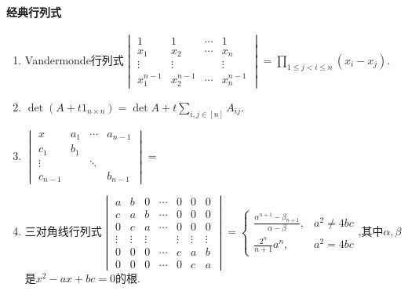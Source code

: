 \documentclass[openany]{book}
\begin{document}
\paragraph{经典行列式}
\begin{enumerate}
    \item Vandermonde行列式$\begin{vmatrix}
        1&1&\cdots&1\\ x_1&x_2&\cdots&x_n\\\vdots&\vdots&&\vdots\\x_1^{n-1}&x_2^{n-1}&\cdots&x_n^{n-1}
    \end{vmatrix}=\prod_{1\leq j<i\leq n}(x_i-x_j)$.
    \item $\det(A+t1_{n\times n})=\det A+t\sum_{i,j\in [n]}A_{ij}$.
    \item $\begin{vmatrix}
        x&a_1&\cdots&a_{n-1}\\c_1&b_1&&\\\vdots&&\ddots&\\c_{n-1}&&&b_{n-1}
    \end{vmatrix}=$
    \item 三对角线行列式$\begin{vmatrix}
    a&b&0&\cdots&0&0&0\\c&a&b&\cdots&0&0&0\\0&c&a&\cdots&0&0&0\\\vdots&\vdots&\vdots&&\vdots&\vdots&\vdots\\0&0&0&\cdots&c&a&b\\0&0&0&\cdots&0&c&a
    \end{vmatrix}=\begin{cases}
        \frac{\alpha^{n+1}-\beta_{n+1}}{\alpha-\beta},&a^2\neq 4bc\\
        \frac{2^n}{n+1}a^n,&a^2=4bc
    \end{cases}$,其中$\alpha,\beta$是$x^2-ax+bc=0$的根.
\end{enumerate}
\end{document}
